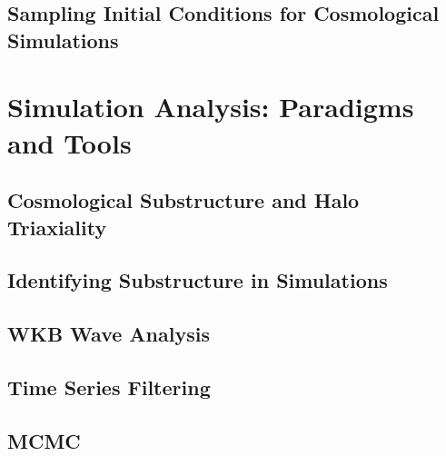 \subsection{Sampling Initial Conditions for Cosmological Simulations}


\section{Simulation Analysis: Paradigms and Tools} \label{sec:analysis_of_sims}
\subsection{Cosmological Substructure and Halo Triaxiality}
\subsection{Identifying Substructure in Simulations}
\subsection{WKB Wave Analysis}
\subsection{Time Series Filtering}
\subsection{MCMC}




